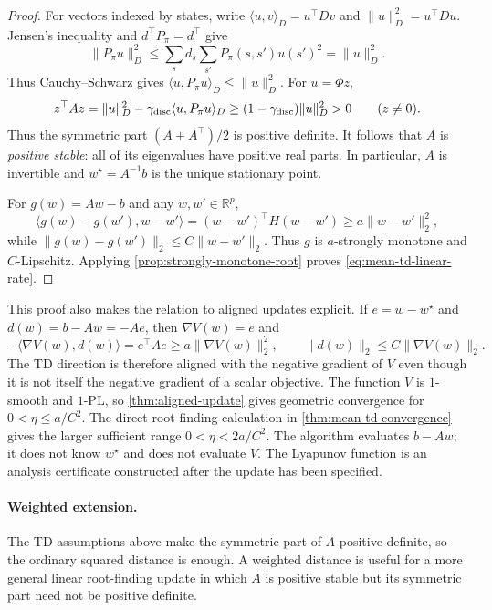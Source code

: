 \documentclass[11pt,twoside]{article}
\newcommand{\R}{\mathbb R}
\theoremstyle{definition}
\theoremstyle{remark}
\begin{document}
\begin{proof}
For vectors indexed by states, write
$\langle u,v\rangle_D=u^\top Dv$ and $\|u\|_D^2=u^\top Du$. Jensen's inequality and
$d^\top P_\pi=d^\top$ give
\[
 \|P_\pi u\|_D^2
 \le \sum_s d_s\sum_{s'}P_\pi(s,s')u(s')^2
 =\|u\|_D^2.
\]
Thus Cauchy--Schwarz gives
$\langle u,P_\pi u\rangle_D\le\|u\|_D^2$. For $u=\Phi z$,
\[
 z^\top Az
 =\|u\|_D^2-\gamma_{\rm disc}\langle u,P_\pi u\rangle_D
 \ge(1-\gamma_{\rm disc})\|u\|_D^2>0
 \qquad(z\ne0).
\]
Thus the symmetric part $(A+A^\top)/2$ is positive definite. It follows that
$A$ is \emph{positive stable}: all of its eigenvalues have positive real
parts. In particular, $A$ is invertible and $w^\star=A^{-1}b$ is the unique
stationary point.

For $g(w)=Aw-b$ and any $w,w'\in\R^p$,
\[
 \langle g(w)-g(w'),w-w'\rangle
 =(w-w')^\top H(w-w')
 \ge a\|w-w'\|_2^2,
\]
while $\|g(w)-g(w')\|_2\le C\|w-w'\|_2$. Thus $g$ is $a$-strongly
monotone and $C$-Lipschitz. Applying
\cref{prop:strongly-monotone-root} proves
\cref{eq:mean-td-linear-rate}.
\end{proof}

This proof also makes the relation to aligned updates explicit. If
$e=w-w^\star$ and $d(w)=b-Aw=-Ae$, then $\nabla V(w)=e$ and
\begin{equation}
 -\langle\nabla V(w),d(w)\rangle
 =e^\top Ae
 \ge a\|\nabla V(w)\|_2^2,
 \qquad
 \|d(w)\|_2\le C\|\nabla V(w)\|_2.
 \label{eq:td-aligned-with-lyapunov}
\end{equation}
The TD direction is therefore aligned with the negative gradient of $V$ even
though it is not itself the negative gradient of a scalar objective. The
function $V$ is $1$-smooth and $1$-PL, so
\cref{thm:aligned-update} gives geometric convergence for
$0<\eta\le a/C^2$. The direct root-finding calculation in
\cref{thm:mean-td-convergence} gives the larger sufficient range
$0<\eta<2a/C^2$. The algorithm evaluates $b-Aw$; it does not know $w^\star$
and does not evaluate
$V$. The Lyapunov function is an analysis certificate constructed after the
update has been specified.

\paragraph{Weighted extension.}
The TD assumptions above make the symmetric part of $A$ positive definite, so
the ordinary squared distance is enough. A weighted distance is useful for a
more general linear root-finding update in which $A$ is positive stable but
its symmetric part need not be positive definite.
\end{document}
